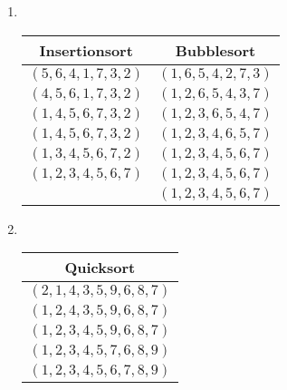 \documentclass[11pt,a4paper]{article}
\begin{document}
\begin{loesung}
    \begin{enumerate}
        \item \ \\
        \begin{table}[h!]
            \centering
            \begin{tabular}{|c|c|}
            \hline
            \textbf{Insertionsort} & \textbf{Bubblesort} \\ \hline
            $(5, 6, 4, 1, 7, 3, 2 )$ & $(1, 6, 5, 4, 2, 7, 3)$ \\ \hline
            $(4, 5, 6, 1, 7, 3, 2)$ & $(1, 2, 6, 5, 4, 3, 7)$ \\ \hline
            $(1, 4, 5, 6, 7, 3, 2)$ & $(1, 2, 3, 6, 5, 4, 7)$ \\ \hline
            $(1, 4, 5, 6, 7, 3, 2)$ & $(1, 2, 3, 4, 6, 5, 7)$ \\ \hline
            $(1, 3, 4, 5, 6, 7, 2)$ & $(1, 2, 3, 4, 5, 6, 7)$ \\ \hline
            $(1, 2, 3, 4, 5, 6, 7)$ & $(1, 2, 3, 4, 5, 6, 7)$ \\ \hline
            &$(1, 2, 3, 4, 5, 6, 7)$ \\ \hline
            \end{tabular}
        \end{table}
        \item \ \\
        \begin{table}[h!]
            \centering
            \begin{tabular}{|c|}
            \hline
            \textbf{Quicksort} \\ \hline
                $(2, 1, 4, 3, 5, 9, 6, 8, 7)$ \\ \hline
                $(1, 2, 4, 3, 5, 9, 6, 8, 7)$ \\ \hline
                $(1, 2, 3, 4, 5, 9, 6, 8, 7)$ \\ \hline
                $(1, 2, 3, 4, 5, 7, 6, 8, 9)$ \\ \hline
                $(1, 2, 3, 4, 5, 6, 7, 8, 9)$ \\ \hline
            \end{tabular}
        \end{table}
        
    \end{enumerate}
    
\end{loesung}
\end{document}
